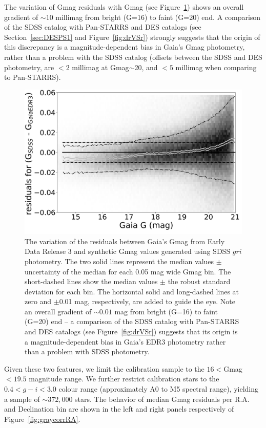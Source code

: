 \documentclass[fleqn,usenatbib]{mnras}
\begin{document}
The variation of Gmag residuals with Gmag (see Figure~\ref{fig:gaiaJump}) shows 
an overall gradient of $\sim10$ millimag from bright (G=16) to faint (G=20) end. 
A comparison of the SDSS catalog with Pan-STARRS and DES catalogs (see 
Section~\ref{sec:DESPS1} and Figure~\ref{fig:drVSr}) strongly suggests that the
origin of this discrepancy is a magnitude-dependent bias in Gaia's Gmag photometry,
rather than a problem with the SDSS catalog (offsets between the SDSS and DES
photometry,  are $<2$ millimag at Gmag$\sim$20, and $<5$ millimag when
comparing to Pan-STARRS). 


\begin{figure}
    \centering\includegraphics[width=0.95\columnwidth]{figures/GmagCorrectionTest_Gmag_Hess.png} 
\caption{The variation of the residuals between Gaia's Gmag from Early Data Release 3
and synthetic Gmag values generated using SDSS $gri$ photometry. The two solid 
lines represent the median values $\pm$ uncertainty of the median for each
0.05 mag wide Gmag bin. The short-dashed lines show the median values $\pm$ 
the robust standard deviation for each bin. The horizontal solid and long-dashed 
lines at zero and $\pm$0.01 mag, respectively, are added to guide the eye.
Note an overall gradient of $\sim0.01$ mag from bright (G=16) to faint (G=20) 
end -- a comparison of the SDSS catalog with Pan-STARRS and DES catalogs (see 
Figure~\ref{fig:drVSr}) suggests that its origin is a magnitude-dependent bias in
 Gaia's EDR3 photometry rather than a problem with SDSS photometry.}
\label{fig:gaiaJump}
\end{figure}


Given these two features, we limit the calibration sample to the $16<$Gmag$<19.5$
magnitude range. We further restrict calibration stars to the $0.4 < g-i < 3.0$ colour 
range (approximately A0 to M5 spectral range), yielding a sample of $\sim372,000$ stars. 
The behavior of median Gmag residuals per R.A. and Declination bin are shown in 
the left and right panels respectively of Figure~\ref{fig:graycorrRA}.%
\end{document}
